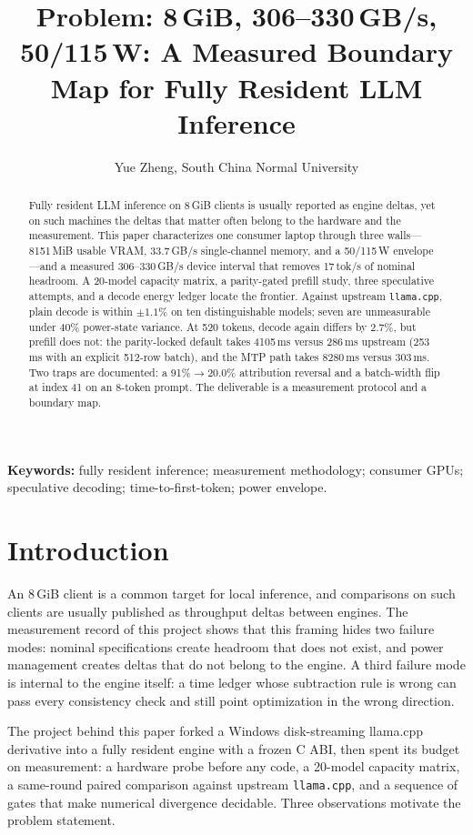 \documentclass[letterpaper,twocolumn,10pt]{article}
\title{\textbf{Problem: 8\,GiB, 306--330\,GB/s, 50/115\,W: A Measured Boundary Map for Fully Resident LLM Inference}}
\author{Yue Zheng, South China Normal University}
\date{}
\begin{document}
\maketitle

\begin{abstract}
Fully resident LLM inference on 8\,GiB clients is usually reported as engine
deltas, yet on such machines the deltas that matter often belong to the
hardware and the measurement. This paper characterizes one consumer laptop
through three walls---8151\,MiB usable VRAM, 33.7\,GB/s single-channel memory,
and a 50/115\,W envelope---and a measured 306--330\,GB/s device interval that
removes 17\,tok/s of nominal headroom. A 20-model capacity matrix, a
parity-gated prefill study, three speculative attempts, and a decode energy
ledger locate the frontier. Against upstream \texttt{llama.cpp}, plain decode
is within $\pm1.1\%$ on ten distinguishable models; seven are unmeasurable
under 40\% power-state variance. At 520 tokens, decode again differs by 2.7\%,
but prefill does not: the parity-locked default takes 4105\,ms versus 286\,ms
upstream (253\,ms with an explicit 512-row batch), and the MTP path takes
8280\,ms versus 303\,ms. Two traps are
documented: a 91\%$\rightarrow$20.0\% attribution reversal and a batch-width
flip at index 41 on an 8-token prompt. The deliverable is a measurement
protocol and a boundary map.
\end{abstract}

\noindent\textbf{Keywords:} fully resident inference; measurement
methodology; consumer GPUs; speculative decoding; time-to-first-token;
power envelope.
\par\medskip

\section{Introduction}

An 8\,GiB client is a common target for local inference, and comparisons on
such clients are usually published as throughput deltas between engines. The
measurement record of this project shows that this framing hides two failure
modes: nominal specifications create headroom that does not exist, and power
management creates deltas that do not belong to the engine. A third failure
mode is internal to the engine itself: a time ledger whose subtraction rule is
wrong can pass every consistency check and still point optimization in the
wrong direction.

The project behind this paper forked a Windows disk-streaming llama.cpp
derivative into a fully resident engine with a frozen C ABI, then spent its
budget on measurement: a hardware probe before any code, a 20-model capacity
matrix, a same-round paired comparison against upstream \texttt{llama.cpp},
and a sequence of gates that make numerical divergence decidable. Three
observations motivate the problem statement.
\end{document}
